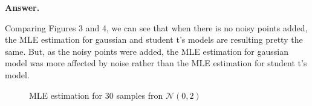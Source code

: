 \documentclass[12pt, fullpage,letterpaper]{article}
\def\red{\color{red}}
\def\blackblue{\color{black!40!blue}}
\begin{document}
\begin{enumerate}
{\red \bf Answer.}{\blackblue 
	Comparing Figures 3 and 4, we can see that when there is no noisy points added, the MLE estimation for gaussian and student t's models are resulting pretty the same. But, as the noisy points were added, the MLE estimation for gaussian model was more affected by noise rather than the MLE estimation for student t's model.  
\begin{figure}[H]
\begin{center}
\begin{minipage}{0.4\textwidth}
     \caption{{\footnotesize MLE estimation for $30$ samples fron $\mathcal{N}(0,2)$ }}\label{Fig.2}      
     \end{minipage}
     \begin{minipage}{0.4\textwidth}

\end{minipage}
\end{center}
\end{figure}}
\end{enumerate}
\end{document}
